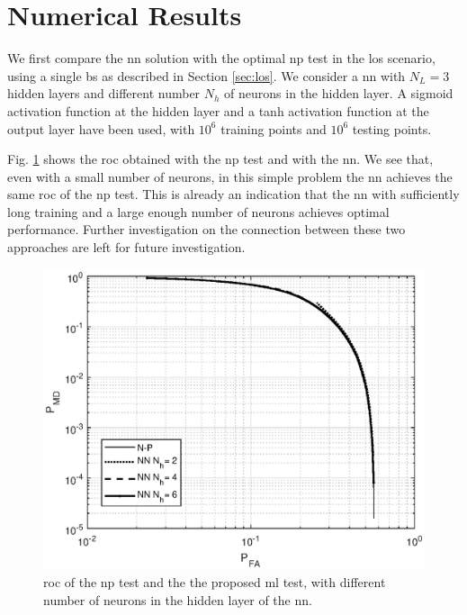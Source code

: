 \documentclass[conference]{IEEEtran}
\begin{document}

\section{Numerical Results}\label{sec: nr}

We first compare the \ac{nn} solution with the optimal \ac{np} test in the \ac{los} scenario, using a single \ac{bs} as described in Section \ref{sec:los}. We consider a \ac{nn} with $N_L=3$ hidden layers and different number $N_h$ of neurons in the hidden layer. A sigmoid activation function at the hidden layer and a tanh activation function at the output layer have been used, with $10^6$ training points  and $10^6$ testing points. 

Fig. \ref{fig:NP_comp} shows the \ac{roc} obtained with the \ac{np} test and with the \ac{nn}. We see that, even with a small number of neurons, in this simple problem the \ac{nn} achieves the same \ac{roc} of the \ac{np} test. This is already an indication that the \ac{nn} with sufficiently long training and a large enough number of neurons achieves optimal performance. Further investigation on the connection between these two approaches are left for future  investigation.
 
 \begin{figure}[h]
     \centering
     \includegraphics[width=0.9\columnwidth]{FA_MD_LOS.eps}
     \caption{\ac{roc} of the \ac{np} test and the the proposed \ac{ml} test,  with different number of neurons in the hidden layer of the \ac{nn}.}
     \label{fig:NP_comp}
 \end{figure}
\end{document}
